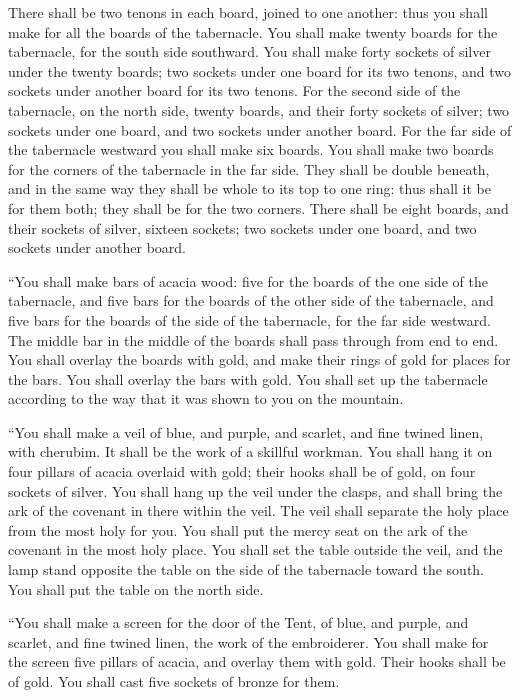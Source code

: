 {There shall be two tenons in each board, joined to one another: thus you shall make for all the boards of the tabernacle.
You shall make twenty boards for the tabernacle, for the south side southward.
You shall make forty sockets of silver under the twenty boards; two sockets under one board for its two tenons, and two sockets under another board for its two tenons.
For the second side of the tabernacle, on the north side, twenty boards,
and their forty sockets of silver; two sockets under one board, and two sockets under another board.
For the far side of the tabernacle westward you shall make six boards.
You shall make two boards for the corners of the tabernacle in the far side.
They shall be double beneath, and in the same way they shall be whole to its top to one ring: thus shall it be for them both; they shall be for the two corners.
There shall be eight boards, and their sockets of silver, sixteen sockets; two sockets under one board, and two sockets under another board.
\par }{\PP {}“You shall make bars of acacia wood: five for the boards of the one side of the tabernacle,
and five bars for the boards of the other side of the tabernacle, and five bars for the boards of the side of the tabernacle, for the far side westward.
The middle bar in the middle of the boards shall pass through from end to end.
You shall overlay the boards with gold, and make their rings of gold for places for the bars. You shall overlay the bars with gold.
You shall set up the tabernacle according to the way that it was shown to you on the mountain.
\par }{\PP {}“You shall make a veil of blue, and purple, and scarlet, and fine twined linen, with cherubim. It shall be the work of a skillful workman.
You shall hang it on four pillars of acacia overlaid with gold; their hooks shall be of gold, on four sockets of silver.
You shall hang up the veil under the clasps, and shall bring the ark of the covenant in there within the veil. The veil shall separate the holy place from the most holy for you.
You shall put the mercy seat on the ark of the covenant in the most holy place.
You shall set the table outside the veil, and the lamp stand opposite the table on the side of the tabernacle toward the south. You shall put the table on the north side.
\par }{\PP {}“You shall make a screen for the door of the Tent, of blue, and purple, and scarlet, and fine twined linen, the work of the embroiderer.
You shall make for the screen five pillars of acacia, and overlay them with gold. Their hooks shall be of gold. You shall cast five sockets of bronze for them.

}
